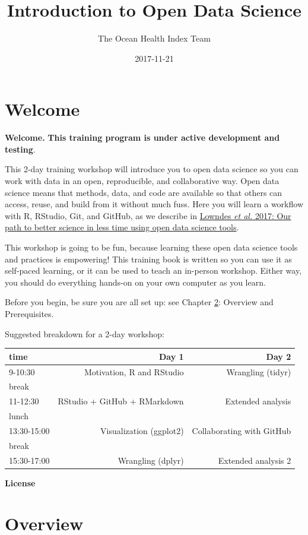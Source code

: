 \documentclass[]{book}
\title{Introduction to Open Data Science}
\author{The Ocean Health Index Team}
\date{2017-11-21}
\theoremstyle{definition}
\theoremstyle{definition}
\theoremstyle{definition}
\theoremstyle{remark}
\begin{document}
\maketitle

{
\setcounter{tocdepth}{1}
\tableofcontents
}
\chapter{Welcome}\label{welcome}

\textbf{Welcome.} \textbf{This training program is under active
development and testing}.

This 2-day training workshop will introduce you to open data science so
you can work with data in an open, reproducible, and collaborative way.
Open data science means that methods, data, and code are available so
that others can access, reuse, and build from it without much fuss. Here
you will learn a workflow with R, RStudio, Git, and GitHub, as we
describe in
\href{https://www.nature.com/articles/s41559-017-0160}{Lowndes \emph{et
al.} 2017: Our path to better science in less time using open data
science tools}.

This workshop is going to be fun, because learning these open data
science tools and practices is empowering! This training book is written
so you can use it as self-paced learning, or it can be used to teach an
in-person workshop. Either way, you should do everything hands-on on
your own computer as you learn.

Before you begin, be sure you are all set up: see Chapter
\ref{overview}: Overview and Prerequisites.

Suggested breakdown for a 2-day workshop:

\begin{longtable}[]{@{}lrr@{}}
\toprule
time & Day 1 & Day 2\tabularnewline
\midrule
\endhead
9-10:30 & Motivation, R and RStudio & Wrangling (tidyr)\tabularnewline
break & &\tabularnewline
11-12:30 & RStudio + GitHub + RMarkdown & Extended
analysis\tabularnewline
lunch & &\tabularnewline
13:30-15:00 & Visualization (ggplot2) & Collaborating with
GitHub\tabularnewline
break & &\tabularnewline
15:30-17:00 & Wrangling (dplyr) & Extended analysis 2\tabularnewline
\bottomrule
\end{longtable}

\textbf{License}

\chapter{Overview}\label{overview}
\end{document}
